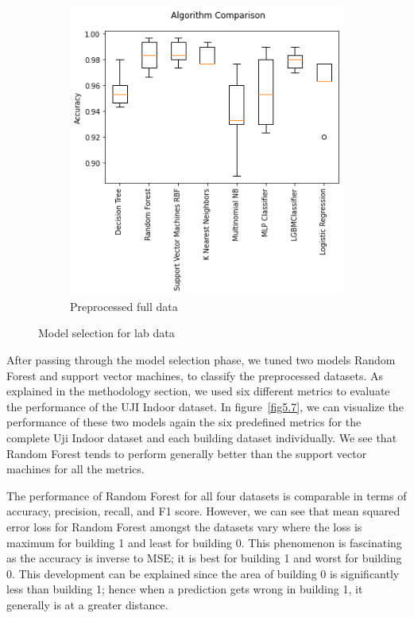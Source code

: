 \documentclass[a4paper,singleside,12pt]{report} %
\begin{document}
\begin{figure}[!htb]
\begin{subfigure}[b]{0.48\linewidth}
			    \includegraphics[width=\linewidth]{./figures/results_model_comparison_preprocessed_full_data_lab.png}
			    \caption{Preprocessed full data}
			  \end{subfigure}
			  \caption{Model selection for lab data}
			  \label{fig5.6}
			\end{figure} 
			
			After passing through the model selection phase, we tuned two models Random Forest and support vector machines, to classify the preprocessed datasets. 
			As explained in the methodology section, we used six different metrics to evaluate the performance of the UJI Indoor dataset. 
			In figure~\ref{fig5.7}, we can visualize the performance of these two models again the six predefined metrics for the complete Uji Indoor dataset and each building dataset individually. 
			We see that Random Forest tends to perform generally better than the support vector machines for all the metrics. 
			
			The performance of Random Forest for all four datasets is comparable in terms of accuracy, precision, recall, and F1 score. 
			However, we can see that mean squared error loss for Random Forest amongst the datasets vary where the loss is maximum for building 1 and least for building 0. 
			This phenomenon is fascinating as the accuracy is inverse to MSE; it is best for building 1 and worst for building 0. 
			This development can be explained since the area of building 0 is significantly less than building 1; hence when a prediction gets wrong in building 1, it generally is at a greater distance. 
			
\end{document}

